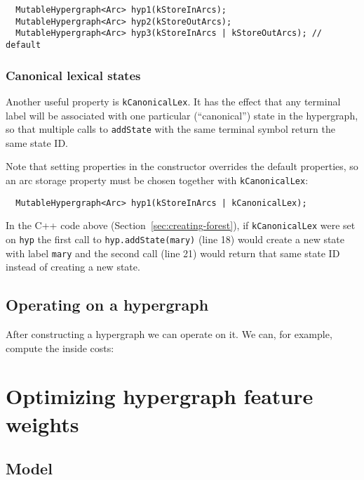 \documentclass[12pt]{article}
\newcommand{\yellowlisting}[1]{%
  }
\newcommand{\secref}[1]{Section~\ref{sec:#1}}
\begin{document}
\begin{lstlisting}
  MutableHypergraph<Arc> hyp1(kStoreInArcs);
  MutableHypergraph<Arc> hyp2(kStoreOutArcs);
  MutableHypergraph<Arc> hyp3(kStoreInArcs | kStoreOutArcs); // default
\end{lstlisting}

\subsubsection{Canonical lexical states}

Another useful property is \texttt{kCanonicalLex}. It has the effect
that any terminal label will be associated with one particular
(``canonical'') state in the hypergraph, so that multiple calls to
\texttt{addState} with the same terminal symbol return the same state
ID.

Note that setting properties in the constructor overrides the default
properties, so an arc storage property must be chosen together with
\texttt{kCanonicalLex}:

\begin{lstlisting}
  MutableHypergraph<Arc> hyp1(kStoreInArcs | kCanonicalLex);
\end{lstlisting}

In the C++ code above (\secref{creating-forest}), if
\texttt{kCanonicalLex} were set on \texttt{hyp} the first call to
\texttt{hyp.addState(mary)} (line 18) would create a new state with
label \texttt{mary} and the second call (line 21) would return that
same state ID instead of creating a new state.

\subsection{Operating on a hypergraph}

After constructing a hypergraph we can operate on it. We can, for
example, compute the inside costs:

\lstset{
  firstnumber=27
}
\yellowlisting{Inside.hpp}

\section{Optimizing hypergraph feature weights}\label{sec:optimize}

\subsection{Model}\label{sec:model}
\end{document}
